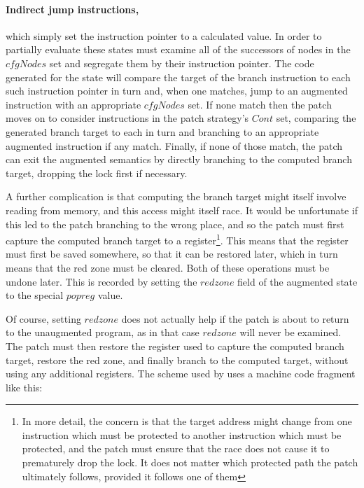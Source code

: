 \paragraph{Indirect jump instructions,} which simply set the instruction pointer
to a calculated value.  In order to partially
evaluate these states {\technique} must examine all of the successors
of nodes in the $\mathit{cfgNodes}$ set and segregate them by their instruction
pointer.  The code generated for the state will compare the target of
the branch instruction to each such instruction pointer in turn and,
when one matches, jump to an augmented instruction with an appropriate
$\mathit{cfgNodes}$ set.  If none match then the patch moves on to consider
instructions in the patch strategy's $Cont$ set,
comparing the generated branch target to each in turn and branching to
an appropriate augmented instruction if any match.  Finally, if none
of those match, the patch can exit the augmented semantics by directly
branching to the computed branch target, dropping the lock first if
necessary.

A further complication is that computing the branch target might
itself involve reading from memory, and this access might itself race.
It would be unfortunate if this led to the patch branching to the
wrong place, and so the patch must first capture the computed branch
target to a register\footnote{In more detail, the concern is that the
  target address might change from one instruction which must be
  protected to another instruction which must be protected, and the
  patch must ensure that the race does not cause it to prematurely
  drop the lock.  It does not matter which protected path the patch
  ultimately follows, provided it follows one of them}.  This means
that the register must first be saved somewhere, so that it can be
restored later, which in turn means that the red zone must be cleared.
Both of these operations must be undone later.  This is recorded by
setting the $redzone$ field of the augmented state to the special
$popreg$ value.

Of course, setting $redzone$ does not actually help if the patch is
about to return to the unaugmented program, as in that case $redzone$
will never be examined.  The patch must then restore the register used
to capture the computed branch target, restore the red zone, and
finally branch to the computed target, without using any additional
registers.  The scheme used by {\implementation} uses a machine code
fragment like this:

